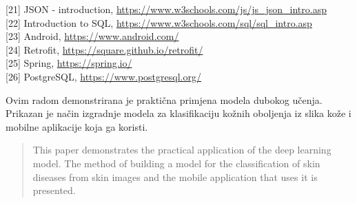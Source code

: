 \documentclass[times, utf8, zavrsni]{fer}
\begin{document}
\noindent{}[21] JSON - introduction, \url{https://www.w3schools.com/js/js_json_intro.asp}\\

\noindent{}[22] Introduction to SQL, \url{https://www.w3schools.com/sql/sql_intro.asp}\\

\noindent{}[23] Android, \url{https://www.android.com/}\\

\noindent{}[24] Retrofit, \url{https://square.github.io/retrofit/}\\

\noindent{}[25] Spring, \url{https://spring.io/}\\

\noindent{}[26] PostgreSQL, \url{https://www.postgresql.org/}\\





\begin{sazetak}
Ovim radom demonstrirana je praktična primjena modela dubokog učenja. Prikazan je način izgradnje modela za klasifikaciju kožnih oboljenja iz slika kože i mobilne aplikacije koja ga koristi. 

\end{sazetak}


\begin{abstract}
This paper demonstrates the practical application of the deep learning model. The method of building a model for the classification of skin diseases from skin images and the mobile application that uses it is presented. 

\end{abstract}
\end{document}

